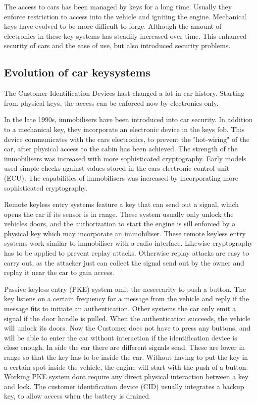 The access to cars has been managed by keys for a long time. %
Usually they enforce restriction to access into the vehicle
and igniting the engine.
Mechanical keys have evolved to be more difficult to forge.
Although the amount of electronics in these key-systems has steadily increased over time.
This enhanced security of cars and the ease of use,
but also introduced security problems.

\subsection*{Evolution of car keysystems}
	The Customer Identification Devices hast changed a lot in car history.
	Starting from physical keys,
	the access can be enforced now by electronics only.

	In the late 1990s, immobilisers have been introduced into car security.
	In addition to a mechanical key, 
	they incorporate an electronic device in the keys fob.
	This device communicates with the cars electronics,
	to prevent the "hot-wiring" of the car,
	after physical access to the cabin has been achieved.
	The strength of the immobilisers was increased with more sophisticated cryptography.
	Early models used simple checks against values stored in the cars electronic control unit (ECU).
	The capabilities of immobilisers was increased by incorporating more
	sophisticated cryptography.

	Remote keyless entry systems feature a key that can send out a signal,
	which opens the car if its sensor is in range.
	These system usually only unlock the vehicles doors,
	and the authorization to start the engine is sill enforced by a physical key
	which may incorporate an immobiliser.
	These remote keyless entry systems work similar to immobiliser with a radio interface.
	Likewise cryptography has to be applied to prevent replay attacks.
	Otherwise replay attacks are easy to carry out,
	as the attacker just can collect the signal send out by the owner
	and replay it near the car to gain access.

	Passive keyless entry (PKE) system omit the nescecarity to push a button.
	The key listens on a certain frequency for a message from the vehicle
	and reply if the message fits to initiate an authentication.
	Other systems the car only emit a signal if the door handle is pulled.
	When the authentication succeeds, the vehicle will unlock its doors.
	Now the Customer does not have to press any buttons,
	and will be able to enter the car without interaction 
	if the identification device is close enough.
	In side the car there are different signals send.
	These are lower in range so that the key has to be inside the car.
	Without having to put the key in a certain spot inside the vehicle,
	the engine will start with the push of a button.
	Working PKE system dont require any direct physical interaction between
	a key and lock.
	The customer identification device (CID) usually integrates a backup key,
	to allow access when the battery is drained. 

